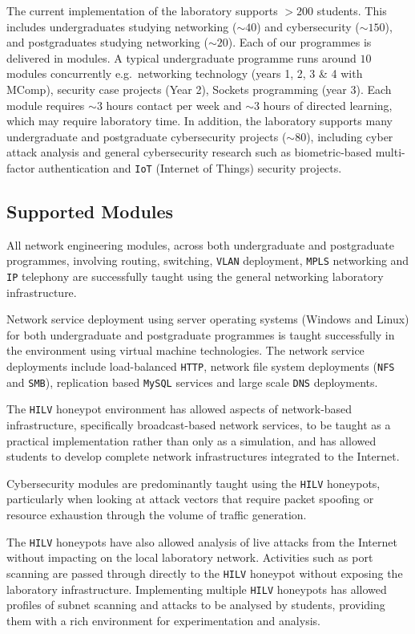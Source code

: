 \documentclass[10pt,journal]{IEEEtran}
\begin{document}
The current implementation of the laboratory supports $>200$ students. This
includes undergraduates studying networking ($\sim40$) and cybersecurity
($\sim150$), and postgraduates studying networking ($\sim20$). Each of our
programmes is delivered in modules.   A typical undergraduate programme runs
around $10$ modules concurrently e.g.\ networking technology (years 1, 2, 3 \&
4 with MComp), security case projects (Year 2), Sockets programming (year 3).
Each module requires $\sim3$ hours contact per week and $\sim3$ hours of
directed learning, which may require laboratory time.  In addition, the
laboratory supports many undergraduate and postgraduate cybersecurity projects
($\sim80$), including cyber attack analysis and general cybersecurity research
such as biometric-based multi-factor authentication and \texttt{IoT} (Internet
of Things) security projects.

\subsection{Supported Modules\label{Modules}}

All network engineering modules, across both undergraduate and postgraduate
programmes, involving routing, switching, \texttt{VLAN} deployment,
\texttt{MPLS} networking and \texttt{IP} telephony are successfully taught
using the general networking laboratory infrastructure.

Network service deployment using server operating systems (Windows and Linux)
for both undergraduate and postgraduate programmes is taught successfully in
the environment using virtual machine technologies. The network service
deployments include load-balanced \texttt{HTTP}, network file system
deployments (\texttt{NFS} and \texttt{SMB}), replication based \texttt{MySQL}
services and large scale \texttt{DNS} deployments.

The \texttt{HILV} honeypot environment has allowed aspects of network-based
infrastructure, specifically broadcast-based network services, to be taught as
a practical implementation rather than only as a simulation, and has allowed
students to develop complete network infrastructures integrated to the
Internet.

Cybersecurity modules are predominantly taught using the \texttt{HILV}
honeypots, particularly when looking at attack vectors that require packet
spoofing or resource exhaustion through the volume of traffic generation.

The \texttt{HILV} honeypots have also allowed analysis of live attacks from the
Internet without impacting on the local laboratory network. Activities such as
port scanning are passed through directly to the \texttt{HILV} honeypot without
exposing the laboratory infrastructure. Implementing multiple \texttt{HILV}
honeypots has allowed profiles of subnet scanning and attacks to be analysed by
students, providing them with a rich environment for experimentation and
analysis.
\end{document}
